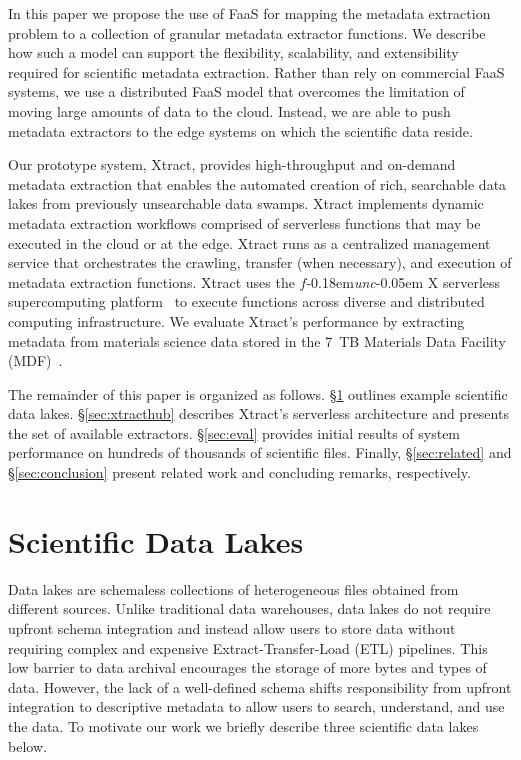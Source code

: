 \documentclass[sigconf]{acmart}
\newcommand{\name}{Xtract}
\newcommand{\funcx}{$f$\kern-0.18em\emph{unc}\kern-0.05em X}
\begin{document}
In this paper we propose the use of FaaS for mapping the metadata extraction problem to a 
collection of granular metadata extractor functions. 
We describe how such a model can support the flexibility, scalability, and extensibility required
for scientific metadata extraction. 
Rather than rely on commercial FaaS systems, we use a distributed FaaS model 
that overcomes the limitation of moving large amounts of data to the cloud. 
Instead, we are able to push
metadata extractors to the edge systems on which the scientific data reside. 

Our prototype system, \name{}, provides high-throughput and on-demand metadata 
extraction that enables the automated creation of rich, searchable data lakes from previously unsearchable data swamps. 
\name{} implements dynamic metadata extraction workflows comprised of serverless functions that may be 
executed in the cloud or at the edge. \name{} runs as a centralized management
service that orchestrates the crawling, transfer (when necessary), and execution of 
metadata extraction functions. %
\name{} uses the \funcx{} serverless supercomputing platform~\cite{chard2019serverless}
to execute functions across diverse and distributed computing infrastructure.
We evaluate \name{}'s performance by extracting metadata from materials
science data stored in the 7~TB Materials Data Facility (MDF)~\cite{blaiszik2016materials, blaiszik2019mdf}. 

The remainder of this paper is organized as follows. 
\S\ref{sec:swamp} outlines example scientific data lakes. 
\S\ref{sec:xtracthub} describes \name{}'s serverless architecture and presents the set of available extractors.
\S\ref{sec:eval} provides initial results of system performance on hundreds of thousands of scientific files.
Finally, \S\ref{sec:related} and \S\ref{sec:conclusion} present related work and concluding remarks, respectively. 


\section{Scientific Data Lakes}
\label{sec:swamp}

Data lakes are schemaless collections of heterogeneous files obtained from different sources. 
Unlike traditional data warehouses, data lakes do not require upfront schema integration and instead allow 
users to store data without requiring complex and expensive Extract-Transfer-Load (ETL) pipelines. 
This low barrier to data archival encourages the storage of more bytes and types of data. 
However, the lack of a well-defined schema shifts responsibility from upfront integration
to descriptive metadata to allow users to search, understand, and use the data. 
To motivate our work we briefly describe three scientific data lakes below. 
\end{document}
